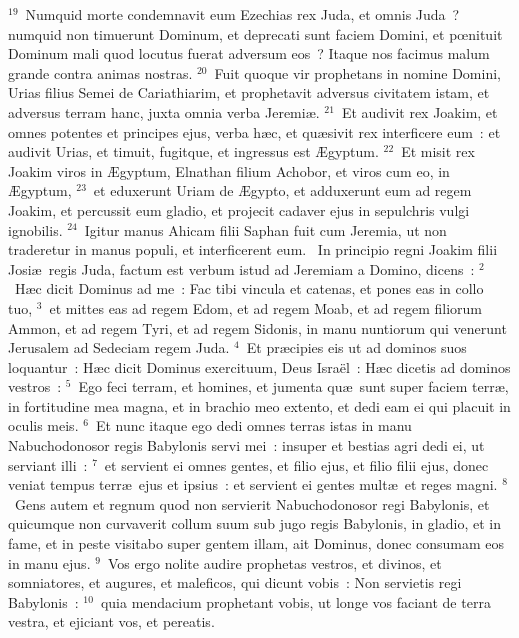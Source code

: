 ${}^{19}$~Numquid morte condemnavit eum Ezechias rex Juda, et omnis Juda~? numquid non timuerunt Dominum, et deprecati sunt faciem Domini, et pœnituit Dominum mali quod locutus fuerat adversum eos~? Itaque nos facimus malum grande contra animas nostras.
${}^{20}$~Fuit quoque vir prophetans in nomine Domini, Urias filius Semei de Cariathiarim, et prophetavit adversus civitatem istam, et adversus terram hanc, juxta omnia verba Jeremi\ae .
${}^{21}$~Et audivit rex Joakim, et omnes potentes et principes ejus, verba h\ae c, et qu\ae sivit rex interficere eum~: et audivit Urias, et timuit, fugitque, et ingressus est \AE gyptum.
${}^{22}$~Et misit rex Joakim viros in \AE gyptum, Elnathan filium Achobor, et viros cum eo, in \AE gyptum,
${}^{23}$~et eduxerunt Uriam de \AE gypto, et adduxerunt eum ad regem Joakim, et percussit eum gladio, et projecit cadaver ejus in sepulchris vulgi ignobilis.
${}^{24}$~Igitur manus Ahicam filii Saphan fuit cum Jeremia, ut non traderetur in manus populi, et interficerent eum.
~In principio regni Joakim filii Josi\ae\ regis Juda, factum est verbum istud ad Jeremiam a Domino, dicens~:
${}^{2}$~H\ae c dicit Dominus ad me~: Fac tibi vincula et catenas, et pones eas in collo tuo,
${}^{3}$~et mittes eas ad regem Edom, et ad regem Moab, et ad regem filiorum Ammon, et ad regem Tyri, et ad regem Sidonis, in manu nuntiorum qui venerunt Jerusalem ad Sedeciam regem Juda.
${}^{4}$~Et pr\ae cipies eis ut ad dominos suos loquantur~: H\ae c dicit Dominus exercituum, Deus Isra\"el~: H\ae c dicetis ad dominos vestros~:
${}^{5}$~Ego feci terram, et homines, et jumenta qu\ae\ sunt super faciem terr\ae , in fortitudine mea magna, et in brachio meo extento, et dedi eam ei qui placuit in oculis meis.
${}^{6}$~Et nunc itaque ego dedi omnes terras istas in manu Nabuchodonosor regis Babylonis servi mei~: insuper et bestias agri dedi ei, ut serviant illi~:
${}^{7}$~et servient ei omnes gentes, et filio ejus, et filio filii ejus, donec veniat tempus terr\ae\ ejus et ipsius~: et servient ei gentes mult\ae\ et reges magni.
${}^{8}$~Gens autem et regnum quod non servierit Nabuchodonosor regi Babylonis, et quicumque non curvaverit collum suum sub jugo regis Babylonis, in gladio, et in fame, et in peste visitabo super gentem illam, ait Dominus, donec consumam eos in manu ejus.
${}^{9}$~Vos ergo nolite audire prophetas vestros, et divinos, et somniatores, et augures, et maleficos, qui dicunt vobis~: Non servietis regi Babylonis~:
${}^{10}$~quia mendacium prophetant vobis, ut longe vos faciant de terra vestra, et ejiciant vos, et pereatis.
